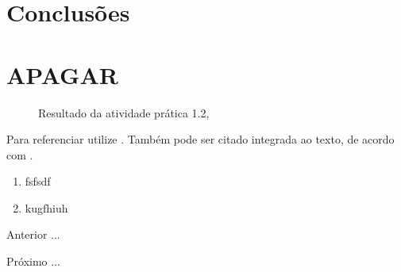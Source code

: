 \section{Conclusões}


\section{APAGAR}

\begin{figure}[H]
  \center
  \caption{Resultado da atividade prática 1.2, \cite{oliveira_SO2009}}\label{fig:ap1_cod_vigual1}
\end{figure}



Para referenciar utilize \cite{ninguem2022curioso}. Também pode ser citado integrada ao texto, de acordo com .




\begin{enumerate}[label=\Roman{*}, ref=(\roman{*})]
  \item fsfsdf
  \item kugfhiuh
\end{enumerate}

\begin{asparaenum}
\item Anterior ... \cite{ninguem2022curioso}
\item Próximo ... \label{pl1}
\end{asparaenum}


